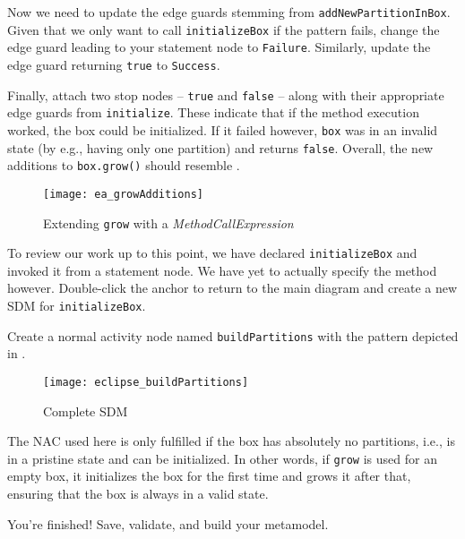 \begin{stepbystep}
\item Now we need to update the edge guards stemming from \texttt{add\-New\-Part\-ition\-In\-Box}. Given that we only want to call
\texttt{initializeBox} if the pattern fails, change the edge guard leading to your statement node to \texttt{Failure}. Similarly, update the edge guard
returning \texttt{true} to \texttt{Success}.

\item Finally, attach two stop nodes -- \texttt{true} and \texttt{false} -- along with their appropriate edge guards from
\texttt{initialize}. These indicate that if the method execution worked, the box could be initialized. If it failed however, \texttt{box} was
in an invalid state (by e.g., having only one partition) and returns \texttt{false}. Overall, the new additions to \texttt{box.grow()} should resemble
.

\vspace{0.5cm}

\begin{figure}[htp]
\begin{center}
  \texttt{[image: ea\_growAdditions]}
  \caption{Extending \texttt{grow} with a \emph{MethodCallExpression}}
  \label{ea:newGrowControl}
\end{center}
\end{figure}

\item To review our work up to this point, we have declared \texttt{initializeBox} and invoked it from a statement node. We have yet
to actually specify the method however. Double-click the anchor to return to the main diagram and create a new SDM
for \texttt{initializeBox}.

\item Create a normal activity node named \texttt{buildPartitions} with the pattern depicted in .

\newpage
 
\begin{figure}[htp]
\begin{center}
  \texttt{[image: eclipse\_buildPartitions]}
  \caption{Complete SDM}
  \label{ea:buildPartitions}
\end{center}
\end{figure}
 
\item The NAC used here is only fulfilled if the box has absolutely no partitions, i.e., is in a pristine state and can be
initialized. In other words, if \texttt{grow} is used for an empty box, it initializes the box for the first time and grows it after that, ensuring that the box
is always in a valid state.
 
\item You're finished! Save, validate, and build your metamodel.

\end{stepbystep}
